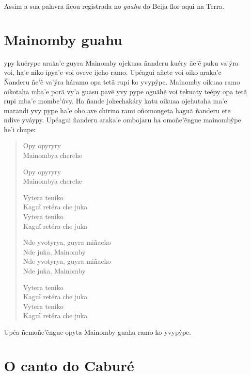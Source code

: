 

Assim a sua palavra ficou registrada no \textit{guahu} do Beija-flor aqui na Terra.

\chapter{Mainomby guahu}

 ypy kuérype araka'e guyra Mainomby ojekuaa ñanderu kuéry ñe'ẽ puku
va'ýra voi, ha'e niko ipya'e voi oveve ijeho ramo. Upéagui añete voi
oiko araka'e Ñanderu ñe'ẽ va'ýra háramo opa tetã rupi ko yvypýpe.
Mainomby oikuaa ramo oikotaha mba'e porã vy'a guasu pavẽ yvy pype oguãhẽ
voi tekuaty teépy opa tetã rupi mba'e mombe'úvy. Ha ñande johechakáry
katu oikuaa ojehutaha ma'e marandi yvy pype ha'e oho ave chirino rami
oñomongeta haguã ñanderu ete ndive yváypy. Upéagui ñanderu araka'e
ombojaru ha omoñe'ẽngue mainombýpe he'i chupe:

\begin{verse}
Opy opyryry\\
Mainombya cherehe

Opy opyryry\\
Mainombya cherehe

Vytera teniko\\
Kaguῖ retéra che juka\\
Vytera teniko\\
Kaguῖ retéra che juka

Nde yvotyrya, guyra miñaeko\\
Nde juka, Mainomby\\
Nde yvotyrya, guyra miñaeko\\
Nde juka, Mainomby

\pagebreak
Vytera teniko\\
Kaguῖ retéra che juka\\
Vytera teniko\\
Kaguῖ retéra che juka
\end{verse}

Upéa ñemoñe'ẽngue opyta Mainomby guahu ramo ko yvypýpe.

\chapter{O canto do Caburé}

